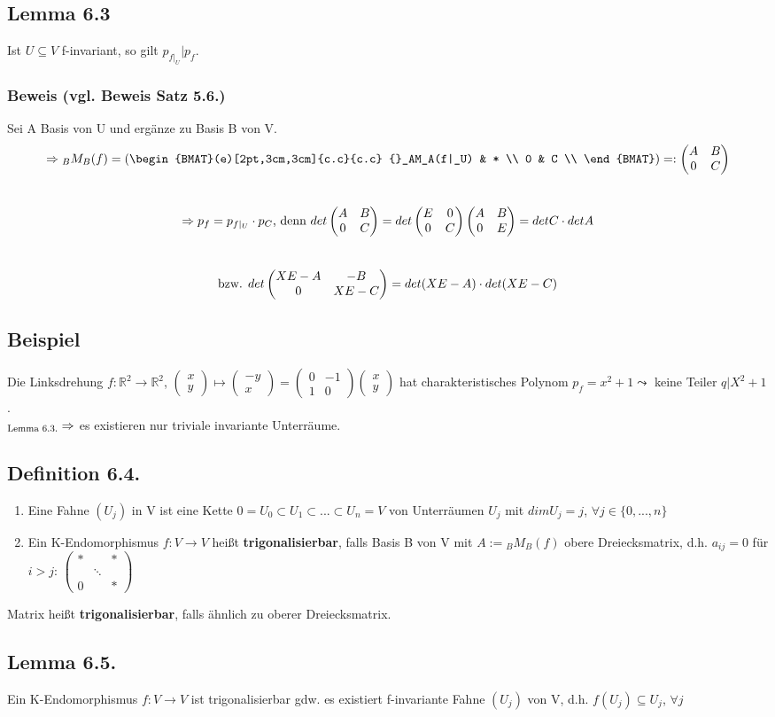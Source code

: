 \documentclass[a4paper, 12pt]{extarticle}
\newcommand{\twoXtwo}[4] {
	\left( 
	\begin{matrix}
		#1 & #2 \\
		#3 & #4
	\end{matrix} 
	\right)
}
\newcommand{\threeXthree}[9] {
	\left( 
	\begin{matrix}
		#1 & #2 & #3\\
		#4 & #5 & #6\\
		#7 & #8 & #9
	\end{matrix}
	\right)
}
\newcommand{\vecTwo}[2] {
	\left( 
	\begin{matrix}
		#1\\
		#2
	\end{matrix} 
	\right)
}
\newcommand{\tn}[1]{\textnormal {#1}}
\begin{document}
\subsection*{Lemma 6.3}
Ist $U\subseteq V$ f-invariant, so gilt $p_{f|_U} | p_f$.
\subsubsection*{Beweis (vgl. Beweis Satz 5.6.)}
Sei A Basis von U und ergänze zu Basis B von V.
$$\Rightarrow {}_BM_B(f) = 
\left(
\begin{BMAT}(e)[2pt,3cm,3cm]{c.c}{c.c}
	{}_AM_A(f|_U) & * \\
	0 & C  \\
\end{BMAT}
\right) =: \twoXtwo	{A}{B}
					{0}{C}$$ \\
$$\Rightarrow p_f = p_{f|_U} \cdot p_C\tn{, denn }det\twoXtwo	{A}{B}{0}{C} = det\twoXtwo{E}{0}{0}{C}\twoXtwo{A}{B}{0}{E} = detC \cdot detA$$\\
$$\tn{bzw. } det \twoXtwo{XE-A}{-B}{0}{XE-C} = det(XE-A)\cdot det(XE-C)$$
\subsection*{Beispiel}
Die Linksdrehung $f:\mathbb R^2 \to \mathbb R^2$, $\vecTwo{x}{y} \mapsto \vecTwo{-y}{x} = \twoXtwo{0}{-1}{1}{0}\vecTwo{x}{y}$ hat charakteristisches Polynom $p_f = x^2+1 \leadsto$ keine Teiler $q|X^2+1$.\\
$_{\tn{Lemma 6.3.}}\Rightarrow$ es existieren nur triviale invariante Unterräume.
\subsection*{Definition 6.4.}
\begin{enumerate}[label=(\alph*)]
	\item Eine Fahne $(U_j)$ in V ist eine Kette ${0} = U_0 \subset U_1 \subset ... \subset U_n = V$ von Unterräumen $U_j$ mit $dim U_j = j$, $\forall j\in \{0,..., n\}$
	\item Ein K-Endomorphismus $f:V\to V$ heißt \textbf{trigonalisierbar}, falls Basis B von V mit $A:= {}_BM_B(f)$ obere Dreiecksmatrix, d.h. $a_{ij}=0$ für $i>j$: $\threeXthree	{*}{ }{*}
																	{ }{\ddots}{ }
																	{0}{ }{*}$
\end{enumerate}										
Matrix heißt \textbf{trigonalisierbar}, falls ähnlich zu oberer Dreiecksmatrix.
\subsection*{Lemma 6.5.}
Ein K-Endomorphismus $f:V\to V$ ist trigonalisierbar gdw. es existiert f-invariante Fahne $(U_j)$ von V, d.h. $f(U_j)\subseteq U_j$, $\forall j$
\end{document}
